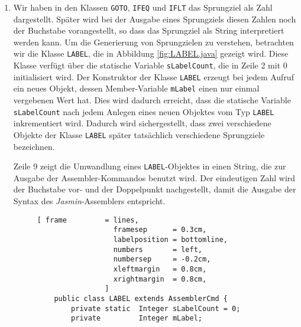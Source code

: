 \begin{enumerate}
\item Wir haben in den  Klassen \texttt{GOTO}, \texttt{IFEQ} und \texttt{IFLT} 
      das Sprungziel als Zahl dargestellt.  Sp\"ater wird bei der Ausgabe eines
      Sprungziels diesen Zahlen noch der Buchstabe  vorangestellt, so dass das
      Sprungziel als String interpretiert werden kann.
      Um die Generierung von Sprungzielen zu verstehen, betrachten wir die Klasse
      \texttt{LABEL}, die in Abbildung \ref{fig:LABEL.java} gezeigt wird.  Diese Klasse
      verf\"ugt \"uber die statische Variable \texttt{sLabelCount}, die in Zeile 2 mit 0
      initialisiert wird.  Der Konstruktor der Klasse \texttt{LABEL} erzeugt bei jedem
      Aufruf ein neues Objekt, dessen Member-Variable \texttt{mLabel} einen nur einmal
      vergebenen Wert hat.  Dies wird dadurch erreicht, dass die statische Variable \texttt{sLabelCount} nach
      jedem Anlegen eines neuen Objektes vom Typ \texttt{LABEL} inkrementiert wird. 
      Dadurch wird sichergestellt, dass zwei verschiedene Objekte der Klasse
      \texttt{LABEL} sp\"ater  tats\"achlich verschiedene Sprungziele bezeichnen.

      Zeile 9 zeigt die Umwandlung eines \texttt{LABEL}-Objektes in einen String, die
      zur Ausgabe der Assembler-Kommandos benutzt wird.  Der eindeutigen Zahl wird
      der Buchstabe  vor- und der Doppelpunkt \qote{:} nachgestellt, damit die
      Ausgabe der Syntax des \textsl{Jasmin}-Assemblers entspricht.
      
      \begin{figure}[!ht]
\centering
\begin{Verbatim}[ frame         = lines, 
                  framesep      = 0.3cm, 
                  labelposition = bottomline,
                  numbers       = left,
                  numbersep     = -0.2cm,
                  xleftmargin   = 0.8cm,
                  xrightmargin  = 0.8cm,
                ]
    public class LABEL extends AssemblerCmd {
        private static  Integer sLabelCount = 0;
        private         Integer mLabel;
    

\end{Verbatim}
\end{figure}
\end{enumerate}
